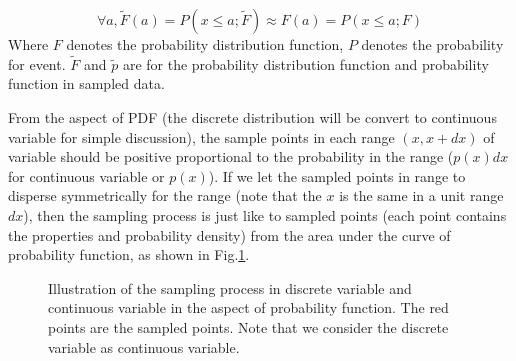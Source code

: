 \documentclass[runningheads,openany]{xhlPaper}
\begin{document}
\begin{equation}
\label{equ:sampDistributionObject}
\forall a,\tilde F\left( a \right) = P\left( {x \le a;\tilde F} \right) \approx F\left( a \right) = P\left( {x \le a;F} \right)
\end{equation}
Where $F$ denotes the probability distribution function, $P$ denotes the probability for event. $\tilde F$ and $\tilde{p}$ are for the probability distribution function and probability function in sampled data. 

From the aspect of PDF (the discrete distribution will be convert to continuous variable for simple discussion), the sample points in each range $\left(x, x + dx\right)$ of variable should be positive proportional to the probability in the range ($p\left(x\right)dx$ for continuous variable or $p\left(x\right)$). If we let the sampled points in range to disperse symmetrically for the range (note that the $x$ is the same in a unit range $dx$), then the sampling process is just like to sampled points (each point contains the properties and probability density) from the area under the curve of probability function, as shown in Fig.\ref{fig:sampProbabilityFunction}.

\begin{figure}
\centering
{}
\caption{Illustration of the sampling process in discrete variable and continuous variable in the aspect of probability function. The red points are the sampled points. Note that we consider the discrete variable as continuous variable.}
\label{fig:sampProbabilityFunction}
\end{figure}
\end{document}
